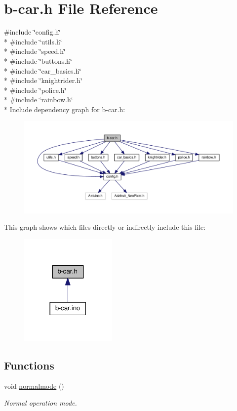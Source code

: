 \hypertarget{b-car_8h}{}\section{b-\/car.h File Reference}
\label{b-car_8h}
{\ttfamily \#include \char`\"{}config.\+h\char`\"{}}\\*
{\ttfamily \#include \char`\"{}utils.\+h\char`\"{}}\\*
{\ttfamily \#include \char`\"{}speed.\+h\char`\"{}}\\*
{\ttfamily \#include \char`\"{}buttons.\+h\char`\"{}}\\*
{\ttfamily \#include \char`\"{}car\+\_\+basics.\+h\char`\"{}}\\*
{\ttfamily \#include \char`\"{}knightrider.\+h\char`\"{}}\\*
{\ttfamily \#include \char`\"{}police.\+h\char`\"{}}\\*
{\ttfamily \#include \char`\"{}rainbow.\+h\char`\"{}}\\*
Include dependency graph for b-\/car.h\+:\nopagebreak
\begin{figure}[H]
\begin{center}
\leavevmode
\includegraphics[width=350pt]{b-car_8h__incl}
\end{center}
\end{figure}
This graph shows which files directly or indirectly include this file\+:\nopagebreak
\begin{figure}[H]
\begin{center}
\leavevmode
\includegraphics[width=134pt]{b-car_8h__dep__incl}
\end{center}
\end{figure}
\subsection*{Functions}
\begin{DoxyCompactItemize}
\item 
void \hyperlink{group__car_gaa0a39b0689218537e29a29f9c3f2af47}{normalmode} ()
\begin{DoxyCompactList}\small\item\em Normal operation mode. \end{DoxyCompactList}\end{DoxyCompactItemize}
